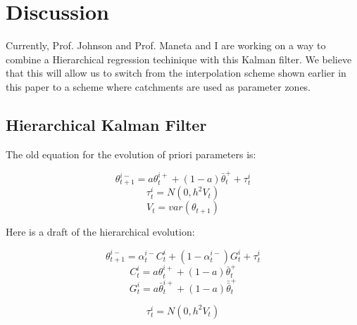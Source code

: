 \chapter{Discussion}

Currently, Prof. Johnson and Prof. Maneta and I are working on a way to combine a Hierarchical regression techinique with this Kalman filter. We believe that this will allow us to switch from the interpolation scheme shown earlier in this paper to a scheme where catchments are used as parameter zones.

\section{Hierarchical Kalman Filter}

The old equation for the evolution of priori parameters is:

\begin{equation}\label{eq:dekf_thetaminus}
\theta_{t+1}^{i-} = a\theta_{t}^{i+} + (1-a)\bar{\theta}_{t}^{+} + \tau_{t}^{i}
\end{equation}
\begin{equation}\label{eq:dekf_tau}
\tau_{t}^{i} = N(0, h^{2}V_{t})
\end{equation}
\begin{equation}\label{eq:dekf_V}
V_{t} = var(\theta_{t+1})
\end{equation}

Here is a draft of the hierarchical evolution:

\begin{equation}\label{eq:dekf_thetanew}
\theta_{t+1}^{i-} = \alpha_{t}^{i-}C_{t}^{i} + (1-\alpha_{t}^{i-})G_{t}^{i} + \tau_{t}^{i}
\end{equation}
\begin{equation}
C_{t}^{i} = a\theta_{t}^{i+} + (1-a)\bar{\theta}_{t}^{+}
\end{equation}
\begin{equation}
G_{t}^{i} = a \bar{\theta}_{t}^{i+} + (1-a)\bar{\bar{\theta}}_{t}^{+}
\end{equation}

\begin{equation}\label{eq:dekf_tau_2}
\tau_{t}^{i} = N(0, h^{2}V_{t})
\end{equation}

